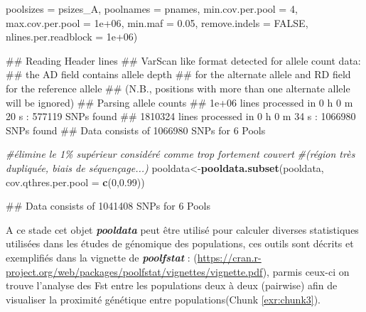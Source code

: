 \documentclass[
  openany]{book}
\newenvironment{Shaded}{\begin{snugshade}}{\end{snugshade}}
\newcommand{\AttributeTok}[1]{\textcolor[rgb]{0.13,0.29,0.53}{#1}}
\newcommand{\CommentTok}[1]{\textcolor[rgb]{0.56,0.35,0.01}{\textit{#1}}}
\newcommand{\ConstantTok}[1]{\textcolor[rgb]{0.56,0.35,0.01}{#1}}
\newcommand{\DecValTok}[1]{\textcolor[rgb]{0.00,0.00,0.81}{#1}}
\newcommand{\FloatTok}[1]{\textcolor[rgb]{0.00,0.00,0.81}{#1}}
\newcommand{\FunctionTok}[1]{\textcolor[rgb]{0.13,0.29,0.53}{\textbf{#1}}}
\newcommand{\NormalTok}[1]{#1}
\newcommand{\OtherTok}[1]{\textcolor[rgb]{0.56,0.35,0.01}{#1}}
\theoremstyle{definition}
\theoremstyle{definition}
\theoremstyle{definition}
\theoremstyle{definition}
\theoremstyle{remark}
\begin{document}
\begin{Shaded}
\begin{Highlighting}[]
                         \AttributeTok{poolsizes =}\NormalTok{ psizes\_A,}
                         \AttributeTok{poolnames =}\NormalTok{ pnames,}
                         \AttributeTok{min.cov.per.pool =} \DecValTok{4}\NormalTok{,}
                         \AttributeTok{max.cov.per.pool =} \FloatTok{1e+06}\NormalTok{,}
                         \AttributeTok{min.maf =} \FloatTok{0.05}\NormalTok{,}
                         \AttributeTok{remove.indels =} \ConstantTok{FALSE}\NormalTok{,}
                         \AttributeTok{nlines.per.readblock =} \FloatTok{1e+06}\NormalTok{)}
\end{Highlighting}
\end{Shaded}

\begin{Shaded}
\begin{Highlighting}[]
\NormalTok{\#\# Reading Header lines}
\NormalTok{\#\# VarScan like format detected for allele count data:}
\NormalTok{\#\#  the AD field contains allele depth}
\NormalTok{\#\# for the alternate allele and RD field for the reference allele}
\NormalTok{\#\# (N.B., positions with more than one alternate allele will be ignored)}
\NormalTok{\#\# Parsing allele counts}
\NormalTok{\#\# 1e+06  lines processed in 0 h  0 m  20 s : 577119 SNPs found}
\NormalTok{\#\# 1810324  lines processed in 0 h  0 m  34 s : 1066980 SNPs found}
\NormalTok{\#\# Data consists of 1066980 SNPs for 6 Pools}
\end{Highlighting}
\end{Shaded}

\begin{Shaded}
\begin{Highlighting}[]
\CommentTok{\#élimine le 1\% supérieur considéré comme trop fortement couvert}
\CommentTok{\#(région très dupliquée, biais de séquençage...)}
\NormalTok{pooldata}\OtherTok{\textless{}{-}}\FunctionTok{pooldata.subset}\NormalTok{(pooldata, }\AttributeTok{cov.qthres.per.pool =} \FunctionTok{c}\NormalTok{(}\DecValTok{0}\NormalTok{,}\FloatTok{0.99}\NormalTok{))}
\end{Highlighting}
\end{Shaded}

\begin{Shaded}
\begin{Highlighting}[]
\NormalTok{\#\# Data consists of 1041408 SNPs for 6 Pools}
\end{Highlighting}
\end{Shaded}

A ce stade cet objet \textbf{\emph{pooldata}} peut être utilisé pour calculer diverses statistiques utilisées dans les études de génomique des populations, ces outils sont décrits et exemplifiés dans la vignette de \textbf{\emph{poolfstat}} : (\url{https://cran.r-project.org/web/packages/poolfstat/vignettes/vignette.pdf}), parmis ceux-ci on trouve l'analyse des Fst entre les populations deux à deux (pairwise) afin de visualiser la proximité génétique entre populations(Chunk \ref{exr:chunk3}).
\end{document}
